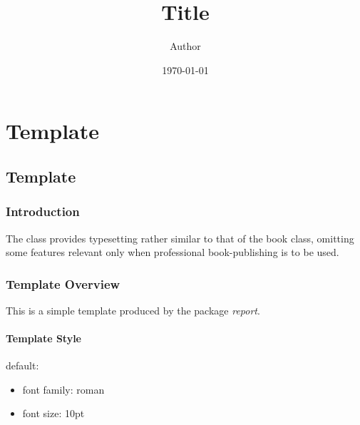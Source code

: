\documentclass{report}
\title{Title}
\author{Author}
\date{\today}
\providecommand{\tightlist}{
\setlength{\itemsep}{0pt}\setlength{\parskip}{0pt}}
\begin{document}
\maketitle
\tableofcontents
\newpage
\part{Template}
\chapter{Template}
\section{Introduction}
{
The class provides typesetting rather similar to that of the book class, omitting some features relevant only when professional book-publishing is to be used.
}
\section{Template Overview}
{
This is a simple template produced by the package \textit{report}.
}
\subsection{Template Style}
{
default:

\begin{itemize}
\tightlist
\item
font family: roman
\item
font size: 10pt
\end{itemize}
}
\end{document}
